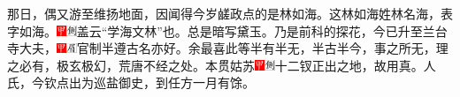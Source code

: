 {那日，偶又游至维扬地面，因闻得今岁鹾政点的是林如海。这林如海姓林名海，表字如海。{\includegraphics[width=3mm]{../Images/00002}\includegraphics[width=3mm]{../Images/00011}\footnotesize \kaishu 盖云``学海文林''也。总是暗写黛玉。}乃是前科的探花，今已升至兰台寺大夫，{\includegraphics[width=3mm]{../Images/00002}\includegraphics[width=3mm]{../Images/00010}\footnotesize \kaishu 官制半遵古名亦好。余最喜此等半有半无，半古半今，事之所无，理之必有，极玄极幻，荒唐不经之处。}本贯姑苏{\includegraphics[width=3mm]{../Images/00002}\includegraphics[width=3mm]{../Images/00011}\footnotesize \kaishu 十二钗正出之地，故用真。}人氏，今钦点出为巡盐御史，到任方一月有馀。

}
